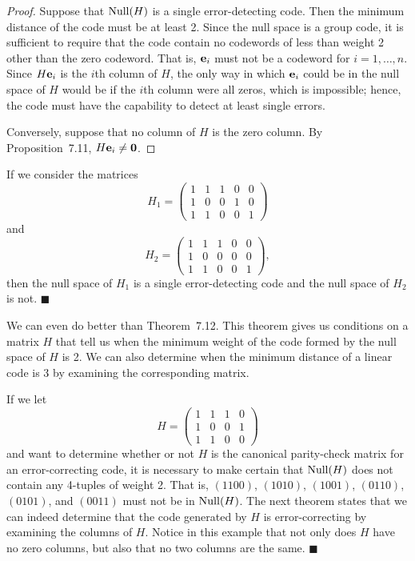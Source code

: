  
\begin{proof}
Suppose that ${\rm Null}(H)$ is a single error-detecting code. Then the minimum
distance of the code must be at least 2. Since the null space is a
group code, it is sufficient to require that the code contain no
codewords of less than weight 2 other than the zero codeword. That
is, ${\bold e}_i$ must not be a codeword for $i = 1, \ldots, n$. Since
$H{\bold e}_i$ is the $i$th column of $H$, the only way in which
${\bold e}_i$ could be in the null space of $H$ would be if the $i$th
column were all zeros, which is impossible; hence, the code must have
the capability to detect at least single errors.
 
 
Conversely, suppose that no column of $H$ is the zero column. By 
Proposition~7.11, $H{\bold e}_i \neq {\bold 0}$.
\end{proof}
 
 
\vspace{2ex}
 
 
If we consider the matrices
\[
H_1 =
\left(
\begin{array}{ccccc}
1 & 1 & 1 & 0 & 0 \\
1 & 0 & 0 & 1 & 0 \\
1 & 1 & 0 & 0 & 1
\end{array}
\right)
\]
and
\[
H_2 =
\left(
\begin{array}{ccccc}
1 & 1 & 1 & 0 & 0 \\
1 & 0 & 0 & 0 & 0 \\
1 & 1 & 0 & 0 & 1
\end{array}
\right),
\]
then the null space of $H_1$ is a single error-detecting code and the
null space of $H_2$ is not. 
\hspace{\fill} $\blacksquare$
 
 
\vspace{2ex}
 
 
We can even do better than Theorem~7.12. This theorem gives us
conditions on a matrix $H$ that tell us when the minimum weight of
the code formed by the null space of $H$ is 2.  We can also
determine when the minimum distance of a linear code is 3 by
examining the corresponding matrix.
 
 
\vspace{2ex}
 
 
If we let
\[
H =
\left(
\begin{array}{cccc}
1 & 1 & 1 & 0 \\
1 & 0 & 0 & 1 \\
1 & 1 & 0 & 0
\end{array}
\right)
\]
and  want to determine whether or not $H$ is the canonical
parity-check matrix for an error-correcting code, it is necessary to
make certain that ${\rm Null}(H)$ does not contain any 4-tuples of weight
2. That is, $(1100)$, $(1010)$, $(1001)$, $(0110)$, $(0101)$, and
$(0011)$ must not be in ${\rm Null}(H)$.  The next theorem states that 
we can
indeed determine that the code generated by $H$ is error-correcting by
examining the columns of $H$. Notice in this example that not only
does $H$ have no zero columns, but also that no two columns are the
same. 
\hspace{\fill} $\blacksquare$
 

